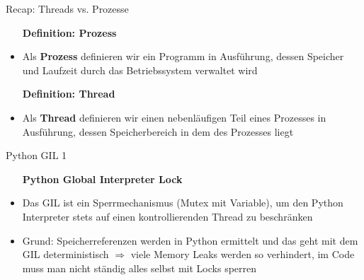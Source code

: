 \begin{frame}{Recap: Threads vs. Prozesse}

     \begin{itemize}
        \setlength{\itemindent}{1.2in}
        \item [\textbf{Definition: Prozess}]
    \end{itemize}

    \begin{itemize}
        \item Als \textbf{Prozess} definieren wir ein Programm in Ausführung, dessen Speicher und Laufzeit durch das Betriebssystem verwaltet wird
     \end{itemize}

  	   \vspace*{10mm}


         \begin{itemize}
        \setlength{\itemindent}{1.2in}
        \item [\textbf{Definition: Thread}]
    \end{itemize}

    \begin{itemize}
        \item Als \textbf{Thread} definieren wir einen nebenläufigen Teil eines Prozesses in Ausführung, dessen Speicherbereich in dem des Prozesses liegt
     \end{itemize}

    \end{frame}



\begin{frame}{Python GIL 1}
                 \begin{itemize}
        \setlength{\itemindent}{1.9in}
        \item [\textbf{Python Global Interpreter Lock }]
    \end{itemize}
    \begin{itemize}
        \item Das GIL ist ein Sperrmechanismus (Mutex mit Variable), um den Python Interpreter stets auf einen kontrollierenden Thread zu beschränken  \cite{realpython.com/python-gil}
        \item Grund: Speicherreferenzen werden in Python ermittelt und das geht mit dem GIL deterministisch $\Rightarrow$ viele Memory Leaks werden so verhindert, im Code muss man nicht ständig alles selbst mit Locks sperren
    \end{itemize}

    \end{frame}

